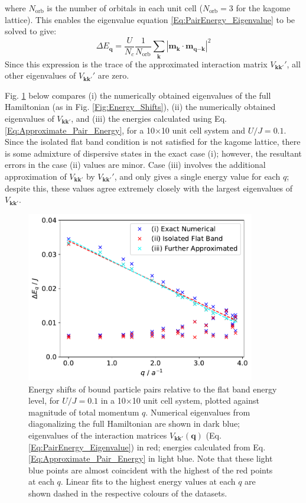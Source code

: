 where $N_{\text{orb}}$ is the number of orbitals in each unit cell ($N_{\text{orb}}=3$ for the kagome lattice). This enables the eigenvalue equation \ref{Eq:PairEnergy_Eigenvalue} to be solved to give:
\begin{equation}\label{Eq:Approximate_Pair_Energy}
    \Delta E_{\textbf{q}}=\frac{U}{N_c}\frac{1}{N_{\text{orb}}}\sum_{\textbf{k}}|\textbf{m}_{\textbf{k}} \cdot \textbf{m}_{\textbf{q}-\textbf{k}}|^2
\end{equation}
Since this expression is the trace of the approximated interaction matrix $V_{\textbf{k}\textbf{k}'}'$, all other eigenvalues of $V_{\textbf{k}\textbf{k}'}'$ are zero.

Fig. \ref{Fig:FB_Analytical_Energy_Shifts} below compares (i) the numerically obtained eigenvalues of the full Hamiltonian (as in Fig. \ref{Fig:Energy_Shifts}), (ii) the numerically obtained eigenvalues of $V_{\textbf{k}\textbf{k}'}$, and (iii) the energies calculated using Eq. \ref{Eq:Approximate_Pair_Energy}, for a 10$\times$10 unit cell system and $U/J=0.1$. Since the isolated flat band condition is not satisfied for the kagome lattice, there is some admixture of dispersive states in the exact case (i); however, the resultant errors in the case (ii) values are minor. Case (iii) involves the additional approximation of $V_{\textbf{k}\textbf{k}'}$ by $V_{\textbf{k}\textbf{k}'}'$, and only gives a single energy value for each $q$; despite this, these values agree extremely closely with the largest eigenvalues of $V_{\textbf{k}\textbf{k}'}$.

\vspace{1cm}

\begin{figure}[ht]
    \centering
    \includegraphics[width=10cm]{Figures/FB_Analytical_Energy_Shifts}
    \caption{Energy shifts of bound particle pairs relative to the flat band energy level, for $U/J=0.1$ in a 10$\times$10 unit cell system, plotted against magnitude of total momentum $q$. Numerical eigenvalues from diagonalizing the full Hamiltonian are shown in dark blue; eigenvalues of the interaction matrices $V_{\textbf{k}\textbf{k}'}(\textbf{q})$ (Eq. \ref{Eq:PairEnergy_Eigenvalue}) in red; energies calculated from Eq. \ref{Eq:Approximate_Pair_Energy} in light blue. Note that these light blue points are almost coincident with the highest of the red points at each $q$. Linear fits to the highest energy values at each $q$ are shown dashed in the respective colours of the datasets.}
    \label{Fig:FB_Analytical_Energy_Shifts}
\end{figure}

